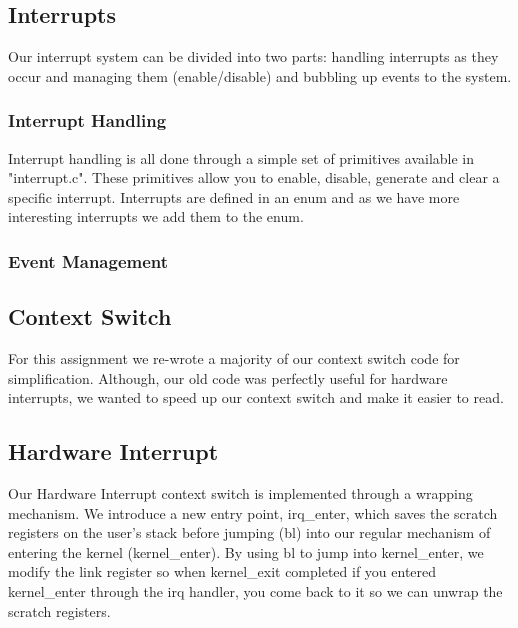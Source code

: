 \documentclass{article}
\begin{document}
\subsection{Interrupts}

Our interrupt system can be divided into two parts: handling interrupts as they occur and managing them (enable/disable) and bubbling up events to the system.

\subsubsection{Interrupt Handling}

Interrupt handling is all done through a simple set of primitives available in "interrupt.c". These primitives allow you to enable, disable, generate and clear a specific interrupt. Interrupts are defined in an enum and as we have more interesting interrupts we add them to the enum.

\subsubsection{Event Management}

\subsection{Context Switch}

For this assignment we re-wrote a majority of our context switch code for simplification. Although, our old code was perfectly useful for hardware interrupts, we wanted to speed up our context switch and make it easier to read.

\subsection{Hardware Interrupt}

Our Hardware Interrupt context switch is implemented through a wrapping mechanism. We introduce a new entry point, irq\_enter, which saves the scratch registers on the user's stack before jumping (bl) into our regular mechanism of entering the kernel (kernel\_enter). By using bl to jump into kernel\_enter, we modify the link register so when kernel\_exit completed if you entered kernel\_enter through the irq handler, you come back to it so we can unwrap the scratch registers.
\end{document}
